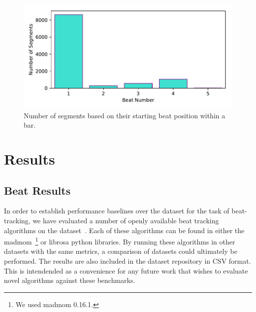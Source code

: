 \documentclass{article}
\begin{document}
\begin{figure}
    \centerline{\includegraphics[width=\columnwidth]{figs/Downbeat_Segment_Alignment.pdf}}
    \caption{Number of segments based on their starting beat position within a bar.}
    \label{fig:downbeat_segment}
\end{figure}

\section{Results}\label{sec:results}

\subsection{Beat Results}

In order to establish performance baselines over the dataset for the task of beat-tracking, we have evaluated a number of openly available beat
tracking algorithms on the dataset~\cite{Ellis2007, Krebs2015, Korzeniowski2014, Bock2011}. Each of these algorithms can be found in either the
madmom~\cite{Bock2016b}\footnote{We used madmom 0.16.1.} or librosa python libraries. By running these algorithms in other datasets with the same metrics, a comparison of datasets could ultimately be performed. The results are also included in the dataset repository in CSV format. This is intendended
as a convenience for any future work that wishes to evaluate novel algorithms against these benchmarks.
\end{document}
